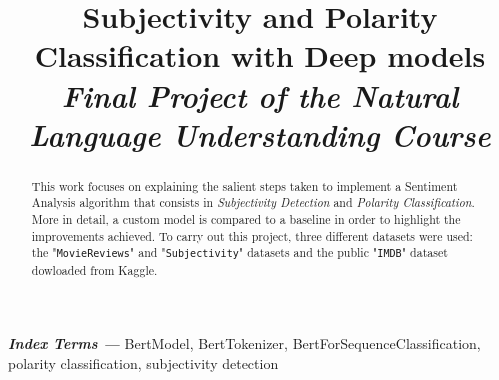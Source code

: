 \documentclass[a4paper, 8pt]{article}
\title{\LARGE{Subjectivity and Polarity Classification with Deep models}\\
\large{\textit{Final Project of the Natural Language Understanding Course}}}
\begin{document}
\maketitle

\begin{abstract}
    This work focuses on explaining the salient steps taken to implement a Sentiment Analysis algorithm that consists in \textit{Subjectivity Detection} and 
    \textit{Polarity Classification}.\\
    More in detail, a custom model is compared to a baseline in order to highlight the improvements achieved. To carry out this project, three different datasets were used: 
    the "\texttt{MovieReviews}" and  "\texttt{Subjectivity}" datasets and the public "\texttt{IMDB}" dataset dowloaded from Kaggle\cite{kaggle}.\\
\end{abstract}


\textbf{\textit{Index Terms ---}} BertModel, BertTokenizer, BertForSequenceClassification, polarity classification, subjectivity detection










\end{document}
